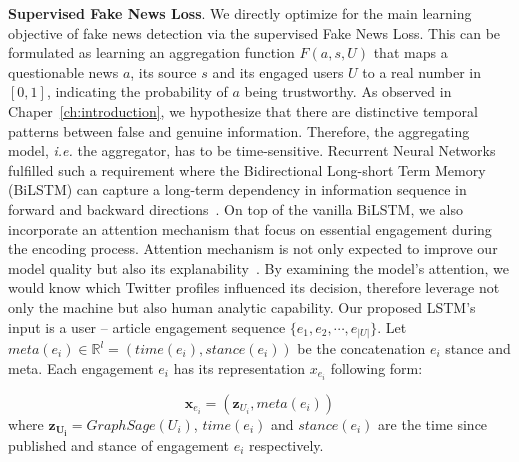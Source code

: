 \documentclass[fyp]{socreport}
\theoremstyle{definition}
\theoremstyle{hypothesis}
\begin{document}
\textbf{Supervised Fake News Loss}. We directly optimize for the main learning objective of fake news detection via the supervised Fake News Loss. This can be formulated as learning an aggregation function $F(a, s, U)$ that maps a questionable news $a$, its source $s$ and its engaged users $U$ to a real number in $[0, 1]$, indicating the probability of $a$ being trustworthy. As observed in Chaper~\ref{ch:introduction}, we hypothesize that there are distinctive temporal patterns between false and genuine information. Therefore, the aggregating model, \textit{i.e.} the aggregator, has to be time-sensitive. Recurrent Neural Networks fulfilled such a requirement where the Bidirectional Long-short Term Memory (BiLSTM) can capture a long-term dependency in information sequence in forward and backward directions~\cite{lstm1997hochreiter}. On top of the vanilla BiLSTM, we also incorporate an attention mechanism that focus on essential engagement during the encoding process. Attention mechanism is not only expected to improve our model quality but also its explanability~\cite{luong2015effective,vaswani2017attention}. By examining the model's attention, we would know which Twitter profiles influenced its decision, therefore leverage not only the machine but also human analytic capability. Our proposed LSTM's input is a user -- article engagement sequence $\{e_1, e_2,\cdots,e_{|U|}\}$. Let $meta(e_i)\in \mathbb{R}^l=(time(e_i),stance(e_i))$ be the concatenation $e_i$ stance and meta. Each engagement $e_i$ has its representation $x_{e_i}$ following form:

\begin{equation}
    \boldsymbol{x}_{e_i} = (\boldsymbol{z}_{U_i}, meta(e_i))
\end{equation}
where $\boldsymbol{z_{U_i}}=GraphSage(U_i)$, $time(e_i)$ and $stance(e_i)$ are the time since published and stance of engagement $e_i$ respectively. 
\end{document}
